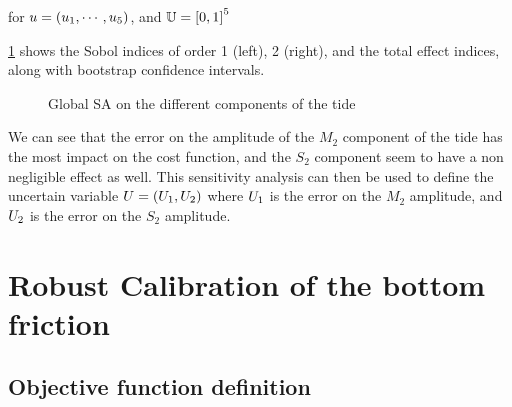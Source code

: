 \documentclass[../../Main_ManuscritThese.tex]{subfiles}
\newcommand\imgpath{/home/victor/acadwriting/Manuscrit/Text/Chapter5/img/}
\begin{document}
for $u = (u_1,\cdots,u_5)$, and $\Uspace = \interval{0}{1}^5$

\cref{fig:SA_tides} shows the Sobol indices of order 1 (left), 2
(right), and the total effect indices, along with bootstrap confidence
intervals.
\begin{figure}[ht]
  \centering
  
  \caption{\label{fig:SA_tides} Global SA on the different components of the tide }
\end{figure}

We can see that the error on the amplitude of the $M_2$ component of
the tide has the most impact on the cost function, and the $S_2$
component seem to have a non negligible effect as well. This
sensitivity analysis can then be used to define the uncertain variable
$U = (U_1, U_2)$ where $U_1$ is the error on the $M_2$
amplitude, and $U_2$ is the error on the $S_2$ amplitude.

\clearpage
\section{Robust Calibration of the bottom friction}

\subsection{Objective function definition}
\end{document}
